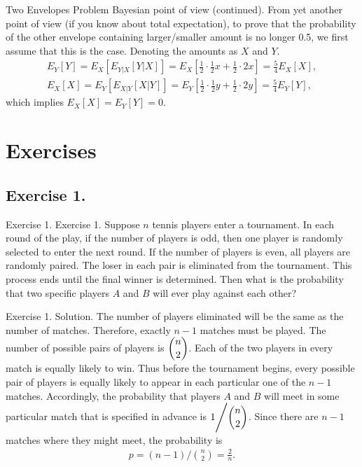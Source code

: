 \documentclass[hyperref={pdfpagelabels=false}]{beamer}
\newcommand{\structb}[1]{\textcolor[rgb]{0.2,0.2,0.7}{#1}}
\begin{document}
\begin{frame}{Two Envelopes Problem}
    \justifying
    \structb{Bayesian point of view (continued).} From yet another point of view (if you know about total expectation), to prove that the probability of the other envelope containing larger/smaller amount is no longer 0.5, we first assume that this is the case. Denoting the amounts as $X$ and $Y$.
    \begin{align*}
        E_{Y}[Y] = E_X\left[E_{Y|X}[Y|X]\right] = E_X\left[\frac{1}{2}\cdot \frac{1}{2}x + \frac{1}{2}\cdot 2x \right] = \frac{5}{4}E_X[X], \\
        E_{X}[X] = E_Y\left[E_{X|Y}[X|Y]\right] = E_Y\left[\frac{1}{2}\cdot \frac{1}{2}y + \frac{1}{2}\cdot 2y \right] = \frac{5}{4}E_Y[Y],
    \end{align*}
    which implies $E_X[X] = E_Y[Y] = 0$.
\end{frame}
%
\section{Exercises}
%
\subsection{Exercise 1.}
\begin{frame}{Exercise 1.}
    \justifying
    \structb{Exercise 1.} Suppose $n$ tennis players enter a tournament. In each round of the play, if the number of players is odd, then one player is randomly selected to enter the next round. If the number of players is even, all players are randomly paired. The loser in each pair is eliminated from the tournament. This process ends until the final winner is determined. Then what is the probability that two specific players $A$ and $B$ will ever play against each other?
\end{frame}
%
\begin{frame}{Exercise 1.}
    \justifying
    \structb{Solution.} The number of players eliminated will be the same as the number of matches. Therefore, exactly $n-1$ matches must be played. The number of possible pairs of players is $\dbinom{n}{2}$. Each of the two players in every match is equally likely to win. Thus before the tournament begins, every possible pair of players is equally likely to appear in each particular one of the $n-1$ matches. Accordingly, the probability that players $A$ and $B$ will meet in some particular match that is specified in advance is $1\Bigg/\dbinom{n}{2}$. Since there are $n-1$ matches where they might meet, the probability is
    \begin{align*}
        p = (n-1)\Bigg/\binom{n}{2} = \frac{2}{n}.
    \end{align*}
\end{frame}
%
\end{document}
